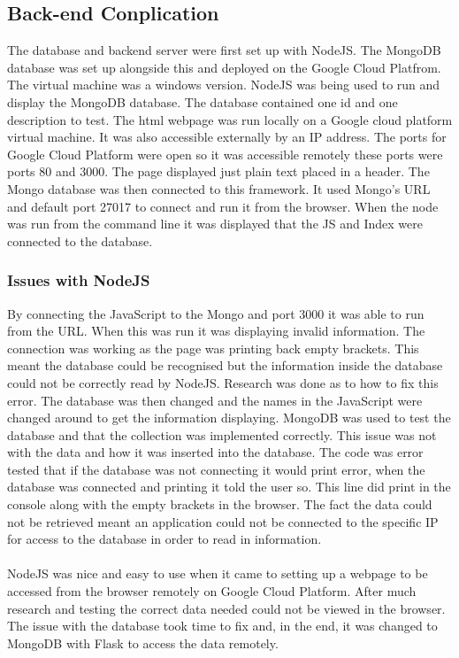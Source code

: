 \subsection{Back-end Conplication}
The database and backend server were first set up with NodeJS. The MongoDB database was set up alongside this and deployed on the Google Cloud Platfrom. The virtual machine was a windows version. NodeJS was being used to run and display the MongoDB database. The database contained one id and one description to test. The html webpage was run locally on a Google cloud platform virtual machine. It was also accessible externally by an IP address. The ports for Google Cloud Platform were open so it was accessible remotely these ports were ports 80 and 3000. The page displayed just plain text placed in a header. The Mongo database was then connected to this framework. It used Mongo's URL and default port 27017 to connect and run it from the browser. When the node was run from the command line it was displayed that the JS and Index were connected to the database. 

\subsubsection{Issues with NodeJS}
By connecting the JavaScript to the Mongo and port 3000 it was able to run from the URL. When this was run it was displaying invalid information. The connection was working as the page was printing back empty brackets. This meant the database could be recognised but the information inside the database could not be correctly read by NodeJS. Research was done as to how to fix this error. The database was then changed and the names in the JavaScript were changed around to get the information displaying. MongoDB was used to test the database and that the collection was implemented correctly. This issue was not with the data and how it was inserted into the database. The code was error tested that if the database was not connecting it would print error, when the database was connected and printing it told the user so. This line did print in the console along with the empty brackets in the browser. The fact the data could not be retrieved meant an application could not be connected to the specific IP for access to the database in order to read in information.
\paragraph{}NodeJS was nice and easy to use when it came to setting up a webpage to be accessed from the browser remotely on Google Cloud Platform. After much research and testing the correct data needed could not be viewed in the browser. The issue with the database took time to fix and, in the end, it was changed to MongoDB with Flask to access the data remotely.

